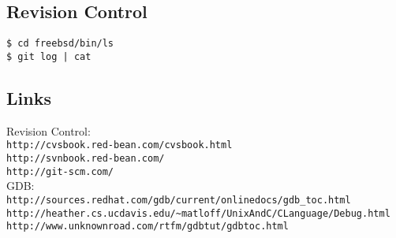 \documentclass[xga]{xdvislides}
\begin{document}
\subsection{Revision Control}
\begin{verbatim}
$ cd freebsd/bin/ls
$ git log | cat
\end{verbatim}

\subsection{Links}
Revision Control: \\
{\tt http://cvsbook.red-bean.com/cvsbook.html} \\

{\tt http://svnbook.red-bean.com/} \\

{\tt http://git-scm.com/} \\

GDB: \\
{\tt http://sources.redhat.com/gdb/current/onlinedocs/gdb\_toc.html} \\

\verb+http://heather.cs.ucdavis.edu/~matloff/UnixAndC/CLanguage/Debug.html+ \\

{\tt http://www.unknownroad.com/rtfm/gdbtut/gdbtoc.html}
\end{document}
